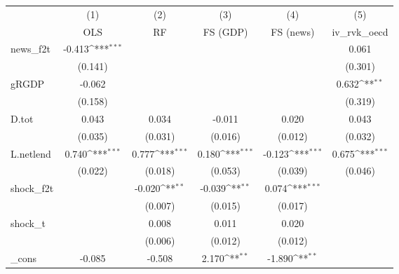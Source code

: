 {
\def\sym#1{\ifmmode^{#1}\else\(^{#1}\)\fi}
\begin{tabular}{l*{5}{c}}
\toprule
            &\multicolumn{1}{c}{(1)}&\multicolumn{1}{c}{(2)}&\multicolumn{1}{c}{(3)}&\multicolumn{1}{c}{(4)}&\multicolumn{1}{c}{(5)}\\
            &\multicolumn{1}{c}{OLS}&\multicolumn{1}{c}{RF}&\multicolumn{1}{c}{FS (GDP)}&\multicolumn{1}{c}{FS (news)}&\multicolumn{1}{c}{iv\_rvk\_oecd}\\
\midrule
news\_f2t    &      -0.413\sym{***}&                     &                     &                     &       0.061         \\
            &     (0.141)         &                     &                     &                     &     (0.301)         \\
\addlinespace
gRGDP       &      -0.062         &                     &                     &                     &       0.632\sym{**} \\
            &     (0.158)         &                     &                     &                     &     (0.319)         \\
\addlinespace
D.tot       &       0.043         &       0.034         &      -0.011         &       0.020         &       0.043         \\
            &     (0.035)         &     (0.031)         &     (0.016)         &     (0.012)         &     (0.032)         \\
\addlinespace
L.netlend   &       0.740\sym{***}&       0.777\sym{***}&       0.180\sym{***}&      -0.123\sym{***}&       0.675\sym{***}\\
            &     (0.022)         &     (0.018)         &     (0.053)         &     (0.039)         &     (0.046)         \\
\addlinespace
shock\_f2t   &                     &      -0.020\sym{**} &      -0.039\sym{**} &       0.074\sym{***}&                     \\
            &                     &     (0.007)         &     (0.015)         &     (0.017)         &                     \\
\addlinespace
shock\_t     &                     &       0.008         &       0.011         &       0.020         &                     \\
            &                     &     (0.006)         &     (0.012)         &     (0.012)         &                     \\
\addlinespace
\_cons      &      -0.085         &      -0.508         &       2.170\sym{**} &      -1.890\sym{**} &                     \\

\end{tabular}}
